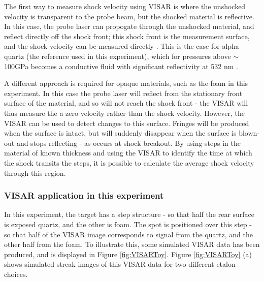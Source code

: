 The first way to measure shock velocity using VISAR is where the unshocked velocity is transparent to the probe beam, but the shocked material is reflective. In this case, the probe laser can propogate through the unshocked material, and reflect directly off the shock front; this shock front is the measurement surface, and the shock velocity can be measured directly \cite{Celliers2004}. This is the case for alpha-quartz (the reference used in this experiment), which for pressures above $\sim$ 100GPa becomes a conductive fluid with significant reflectivity at 532 \unit{\nano\meter} \cite{Hicks2006a}.

A different approach is required for opaque materials, such as the foam in this experiment. In this case the probe laser will reflect from the stationary front surface of the material, and so will not reach the shock front - the VISAR will thus measure the a zero velocity rather than the shock velocity. However, the VISAR can be used to detect changes to this surface. Fringes will be produced when the surface is intact, but will suddenly disappear when the surface is blown-out and stops reflecting - as occurs at shock breakout. By using steps in the material of known thickness and using the VISAR to identify the time at which the shock transits the steps, it is possible to calculate the average shock velocity through this region.

\subsubsection{VISAR application in this experiment}

In this experiment, the target has a step structure - so that half the rear surface is exposed quartz, and the other is foam. The spot is positioned over this step - so that half of the VISAR image corresponds to signal from the quartz, and the other half from the foam. To illustrate this, some simulated VISAR data has been produced, and is displayed in Figure \ref{fig:VISARToy}. Figure \ref{fig:VISARToy} (a) shows simulated streak images of this VISAR data for two different etalon choices.

